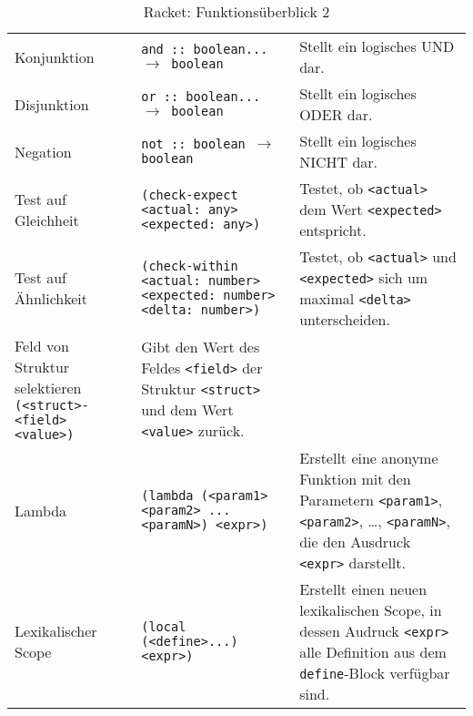 \begin{sidewaystable}
\begin{tabular}{p{5cm} | p{7cm} | p{9cm}}
		\hline
		Konjunktion                                                       & \texttt{and :: boolean... $ \rightarrow $ boolean}                                                             & Stellt ein logisches UND dar.                                                                                                                                 \\
		Disjunktion                                                       & \texttt{or :: boolean... $ \rightarrow $ boolean}                                                              & Stellt ein logisches ODER dar.                                                                                                                                \\
		Negation                                                          & \texttt{not :: boolean $ \rightarrow $ boolean}                                                                & Stellt ein logisches NICHT dar.                                                                                                                               \\
		\hline
		Test auf Gleichheit                                               & \texttt{(check-expect <actual: any> <expected: any>)}                                                          & Testet, ob \texttt{<actual>} dem Wert \texttt{<expected>} entspricht.                                                                                         \\
		Test auf Ähnlichkeit                                              & \texttt{(check-within <actual: number> <expected: number> <delta: number>)}                                    & Testet, ob \texttt{<actual>} und \texttt{<expected>} sich um maximal \texttt{<delta>} unterscheiden.                                                          \\
		\hline
		Feld von Struktur selektieren \texttt{(<struct>-<field> <value>)} & Gibt den Wert des Feldes \texttt{<field>} der Struktur \texttt{<struct>} und dem Wert \texttt{<value>} zurück.                                                                                                                                                                 \\
		\hline
		Lambda                                                            & \texttt{(lambda (<param1> <param2> ... <paramN>) <expr>)}                                                      & Erstellt eine anonyme Funktion mit den Parametern \texttt{<param1>}, \texttt{<param2>}, \dots, \texttt{<paramN>}, die den Ausdruck \texttt{<expr>} darstellt. \\
		Lexikalischer Scope                                               & \texttt{(local (<define>...) <expr>)}                                                                          & Erstellt einen neuen lexikalischen Scope, in dessen Audruck \texttt{<expr>} alle Definition aus dem \texttt{define}-Block verfügbar sind.                     \\
	\end{tabular}
	\caption{Racket: Funktionsüberblick 2}
\end{sidewaystable}
